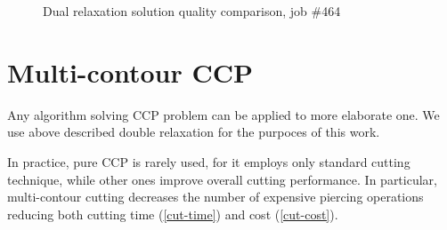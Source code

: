 \documentclass{../download/tPRS2e}
\begin{document}
\begin{figure}
    \begin{center}
    \caption{Dual relaxation solution quality comparison, job \#464} \label{quality}
    \end{center}
\end{figure}

\hrulefill

\section{Multi-contour CCP}

Any algorithm solving CCP problem
can be applied to more elaborate one.
We use above described double relaxation
for the purpoces of this work.

In practice, pure CCP is rarely used,
for it employs only standard cutting technique,
while other ones improve overall cutting performance.
In particular,
multi-contour cutting decreases
the number of expensive piercing operations
reducing both cutting time (\ref{cut-time})
and cost (\ref{cut-cost}).
\end{document}
